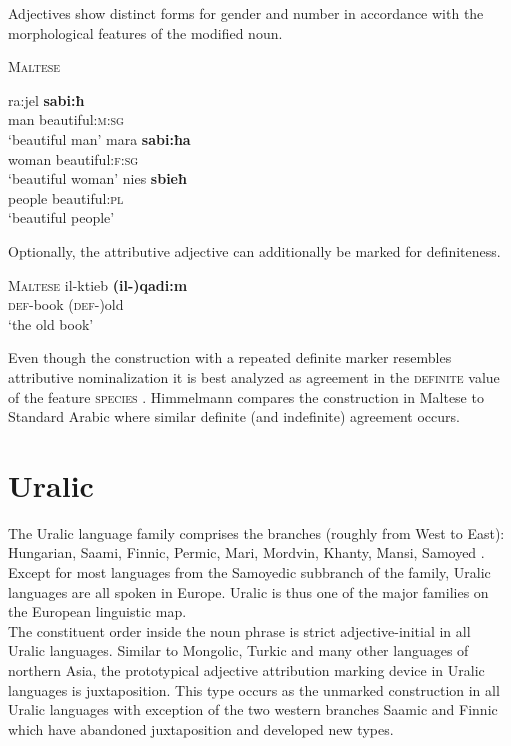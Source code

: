 Adjectives show distinct forms for gender and number in accordance with the morphological features of the modified noun.
\begin{exe}
\ex \textsc{Maltese} \citep[328]{aquilina1959}
\begin{xlist}
\ex
\gll	ra:jel \textbf{sabi:ħ}\\
	man beautiful:\textsc{m:sg}\\
\glt	‘beautiful man’
\ex
\gll	mara \textbf{sabi:ħa}\\
	woman beautiful:\textsc{f:sg}\\
\glt	‘beautiful woman’
\ex
\gll	nies \textbf{sbieħ}\\
	people beautiful:\textsc{pl}\\
\glt	‘beautiful people’
\end{xlist}
\end{exe}
Optionally, the attributive adjective can additionally be marked for definiteness. \begin{exe}
\ex \textsc{Maltese} \citep[330]{aquilina1959} 
\gll	il-ktieb \textbf{(il-)qadi:m}\\
	\textsc{def}-book	(\textsc{def-})old\\
\glt	‘the old book’
\end{exe}
Even though the construction with a repeated definite marker resembles attributive nominalization it is best analyzed as agreement in the \textsc{definite} value of the feature \textsc{species} \citep[179]{himmelmann1997}. Himmelmann compares the construction in Maltese to Standard Arabic where similar definite (and indefinite) agreement occurs.
				
\section{Uralic}\label{uralic synchr}
The Uralic language family comprises the branches (roughly from West to East): Hungarian, Saami, Finnic, Permic, Mari, Mordvin, Khanty, Mansi, Samo\-yed \cite[216–218]{salminen2007}. Except for most languages from the Samoyedic subbranch of the family, Uralic languages are all spoken in Europe. Uralic is thus one of the major families on the European linguistic map.\\

\noindent The constituent order inside the noun phrase is strict adjective-initial in all Uralic languages. Similar to Mongolic, Turkic and many other languages of northern Asia, the prototypical adjective attribution marking device in Uralic languages is juxtaposition. This type occurs as the unmarked construction in all Uralic languages with exception of the two western branches Saamic and Finnic which have abandoned juxtaposition and developed new types.

